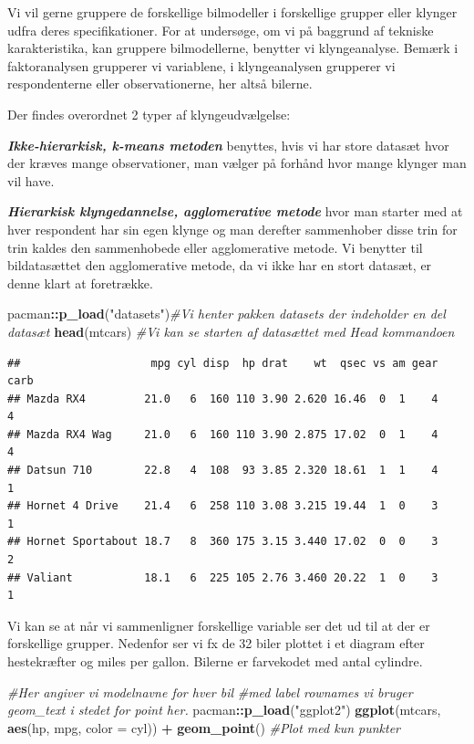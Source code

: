 \documentclass[]{book}
\newenvironment{Shaded}{\begin{snugshade}}{\end{snugshade}}
\newcommand{\CommentTok}[1]{\textcolor[rgb]{0.56,0.35,0.01}{\textit{#1}}}
\newcommand{\DataTypeTok}[1]{\textcolor[rgb]{0.13,0.29,0.53}{#1}}
\newcommand{\KeywordTok}[1]{\textcolor[rgb]{0.13,0.29,0.53}{\textbf{#1}}}
\newcommand{\NormalTok}[1]{#1}
\newcommand{\OperatorTok}[1]{\textcolor[rgb]{0.81,0.36,0.00}{\textbf{#1}}}
\newcommand{\StringTok}[1]{\textcolor[rgb]{0.31,0.60,0.02}{#1}}
\begin{document}
Vi vil gerne gruppere de forskellige bilmodeller i forskellige grupper eller klynger udfra deres specifikationer. For at undersøge, om vi på baggrund af tekniske karakteristika, kan gruppere bilmodellerne, benytter vi klyngeanalyse. Bemærk i faktoranalysen grupperer vi variablene, i klyngeanalysen grupperer vi respondenterne eller observationerne, her altså bilerne.

Der findes overordnet 2 typer af klyngeudvælgelse:

\textbf{\emph{Ikke-hierarkisk, k-means metoden}} benyttes, hvis vi har store datasæt hvor der kræves mange observationer, man vælger på forhånd hvor mange klynger man vil have.

\textbf{\emph{Hierarkisk klyngedannelse, agglomerative metode}} hvor man starter med at hver respondent har sin egen klynge og man derefter sammenhober disse trin for trin kaldes den sammenhobede eller agglomerative metode. Vi benytter til bildatasættet den agglomerative metode, da vi ikke har en stort datasæt, er denne klart at foretrække.

\begin{Shaded}
\begin{Highlighting}[]
\NormalTok{pacman}\OperatorTok{::}\KeywordTok{p_load}\NormalTok{(}\StringTok{"datasets"}\NormalTok{)}\CommentTok{#Vi henter pakken datasets der indeholder en del datasæt}
\KeywordTok{head}\NormalTok{(mtcars) }\CommentTok{#Vi kan se starten af datasættet med Head kommandoen}
\end{Highlighting}
\end{Shaded}

\begin{verbatim}
##                    mpg cyl disp  hp drat    wt  qsec vs am gear carb
## Mazda RX4         21.0   6  160 110 3.90 2.620 16.46  0  1    4    4
## Mazda RX4 Wag     21.0   6  160 110 3.90 2.875 17.02  0  1    4    4
## Datsun 710        22.8   4  108  93 3.85 2.320 18.61  1  1    4    1
## Hornet 4 Drive    21.4   6  258 110 3.08 3.215 19.44  1  0    3    1
## Hornet Sportabout 18.7   8  360 175 3.15 3.440 17.02  0  0    3    2
## Valiant           18.1   6  225 105 2.76 3.460 20.22  1  0    3    1
\end{verbatim}

Vi kan se at når vi sammenligner forskellige variable ser det ud til at der er forskellige grupper. Nedenfor ser vi fx de 32 biler plottet i et diagram efter hestekræfter og miles per gallon. Bilerne er farvekodet med antal cylindre.

\begin{Shaded}
\begin{Highlighting}[]
\CommentTok{#Her angiver vi modelnavne for hver bil}
\CommentTok{#med label rownames vi bruger geom_text i stedet for point her.}
\NormalTok{pacman}\OperatorTok{::}\KeywordTok{p_load}\NormalTok{(}\StringTok{"ggplot2"}\NormalTok{)}
\KeywordTok{ggplot}\NormalTok{(mtcars, }\KeywordTok{aes}\NormalTok{(hp, mpg, }\DataTypeTok{color =}\NormalTok{ cyl)) }\OperatorTok{+}
\StringTok{  }\KeywordTok{geom_point}\NormalTok{() }\CommentTok{#Plot med kun punkter}
\end{Highlighting}
\end{Shaded}
\end{document}
